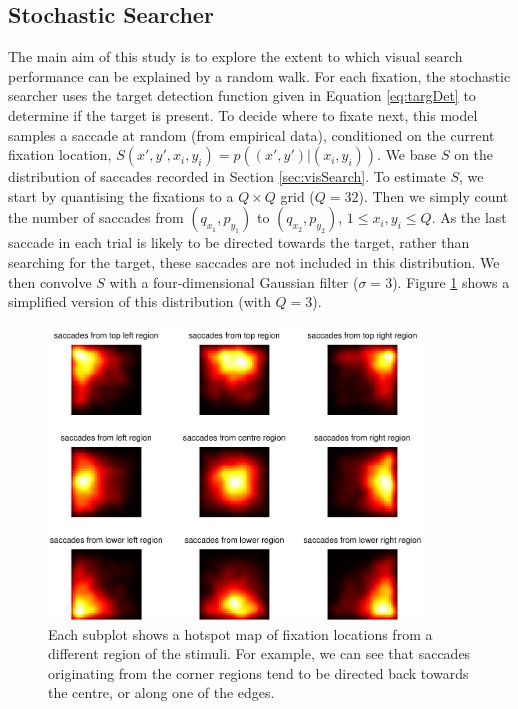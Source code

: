 \documentclass[preprint, authoryear]{elsarticle} %
\begin{document}
\subsection{Stochastic Searcher}

The main aim of this study is to explore the extent to which visual search performance can be explained by a random walk. For each fixation, the stochastic searcher uses the target detection function given in Equation \ref{eq:targDet} to determine if the target is present. To decide where to fixate next, this model samples a saccade at random (from empirical data), conditioned on the current fixation location, $S(x',y',x_i, y_i)=p\left((x',y')|(x_i,y_i)\right)$. We base $S$ on the distribution of saccades recorded in Section \ref{sec:visSearch}. To estimate $S$, we start by quantising the fixations to a $Q\times Q$ grid ($Q=32$). Then we simply count the number of saccades from $(q_{x_1}, p_{y_1})$ to $(q_{x_2}, p_{y_2})$, $1\leq x_i, y_i \leq Q$. As the last saccade in each trial is likely to be directed towards the target, rather than searching for the target, these saccades are not included in this distribution. We then convolve $S$ with a four-dimensional Gaussian filter ($\sigma=3$). Figure \ref{fig:saccDistExample} shows a simplified version of this distribution (with $Q=3$). 

\begin{figure}
	\centering
	\includegraphics[width=10cm]{fig/saccDistExample.pdf}
	\caption{Each subplot shows a hotspot map of fixation locations from a different region of the stimuli. For example, we can see that saccades originating from the corner regions tend to be directed back towards the centre, or along one of the edges.}
	\label{fig:saccDistExample}
\end{figure}
\end{document}
